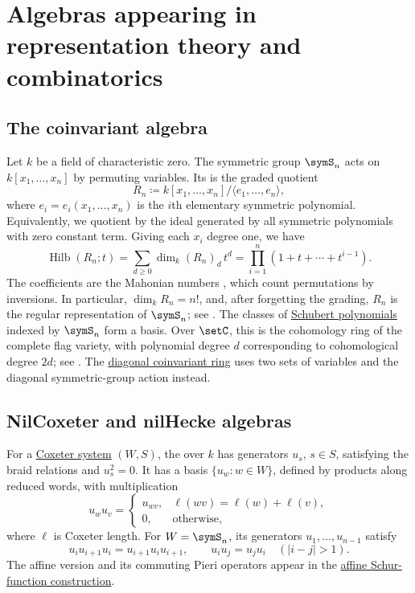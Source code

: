 


\section[algebras]{Algebras appearing in representation theory and combinatorics}

\subsection[coinvariantAlgebra]{The coinvariant algebra}

Let $k$ be a field of characteristic zero. The symmetric group $\symS_n$
acts on $k[x_1,\dotsc,x_n]$ by permuting variables. Its
 is the graded quotient
\[
 R_n\coloneqq k[x_1,\dotsc,x_n]/\langle e_1,\dotsc,e_n\rangle,
\]
where $e_i=e_i(x_1,\dotsc,x_n)$ is the $i$th elementary symmetric polynomial.
Equivalently, we quotient by the ideal generated by all symmetric polynomials
with zero constant term. Giving each $x_i$ degree one, we have
\[
 \operatorname{Hilb}(R_n;t)
 =\sum_{d\geq0}\dim_k(R_n)_d\,t^d
 =\prod_{i=1}^n(1+t+\dotsb+t^{i-1}).
\]
The coefficients are the Mahonian numbers , which count
permutations by inversions.
In particular, $\dim_k R_n=n!$, and, after forgetting the grading, $R_n$
is the regular representation of $\symS_n$; see
\cite[Sec.~1]{HaglundRhoadesShimozono2018}.
The classes of \hyperref[schubert]{Schubert polynomials} indexed by
$\symS_n$ form a basis. Over $\setC$, this is the cohomology ring of the
complete flag variety, with polynomial degree $d$ corresponding to
cohomological degree $2d$; see \cite{Fulton1997}.
The \hyperref[diagonalCoinvariantRing]{diagonal coinvariant ring} uses two
sets of variables and the diagonal symmetric-group action instead.

\subsection[nilCoxeterAlgebra]{NilCoxeter and nilHecke algebras}

For a \hyperref[coxeterGroups]{Coxeter system} $(W,S)$, the
 over $k$ has generators $u_s$, $s\in S$,
satisfying the braid relations and $u_s^2=0$.
It has a basis $\{u_w:w\in W\}$, defined by products along reduced words,
with multiplication
\[
 u_wu_v=
 \begin{cases}
 u_{wv},&\ell(wv)=\ell(w)+\ell(v),\\
 0,&\text{otherwise},
 \end{cases}
\]
where $\ell$ is Coxeter length. For $W=\symS_n$, its generators
$u_1,\dotsc,u_{n-1}$ satisfy
\[
 u_i u_{i+1}u_i=u_{i+1}u_i u_{i+1},\qquad
 u_i u_j=u_j u_i\quad(|i-j|>1).
\]
The affine version and its commuting Pieri operators appear in the
\hyperref[schurAffinePieriOperators]{affine Schur-function construction}.


